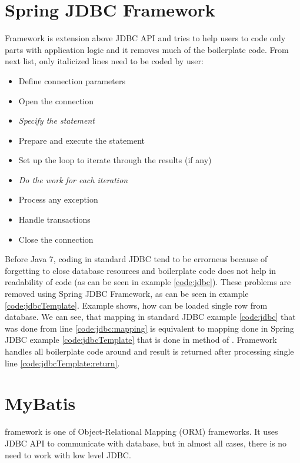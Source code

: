 \section{Spring JDBC Framework}
\citet{SpringJDBC} Framework is extension above JDBC API and tries to help users to code only
parts with application logic and it removes much of the boilerplate code.
From next list, only italicized lines need to be coded by user:
\begin{itemize}
  \item Define connection parameters
  \item Open the connection
  \item \textit{Specify the statement}
  \item Prepare and execute the statement
  \item Set up the loop to iterate through the results (if any)
  \item \textit{Do the work for each iteration}
  \item Process any exception
  \item Handle transactions
  \item Close the connection   
\end{itemize}
Before Java 7, coding in standard JDBC tend to be errorneus because of forgetting to close
database resources and boilerplate code does not help in readability of code
(as can be seen in example \ref{code:jdbc}). These problems are removed using Spring JDBC Framework,
as can be seen in example \ref{code:jdbcTemplate}. Example shows, how can be loaded single row from database.
We can see, that mapping in standard JDBC example \ref{code:jdbc} that was done from line \ref{code:jdbc:mapping} is
equivalent to mapping done in Spring JDBC example \ref{code:jdbcTemplate} that is done in  method of .
Framework handles all boilerplate code around and result is returned after processing single line \ref{code:jdbcTemplate:return}.







\section{MyBatis}

\citet{MyBatis} framework is one of Object-Relational Mapping (ORM) frameworks.
It uses JDBC API to communicate with database, but in almost all cases, there is no need
to work with low level JDBC.

